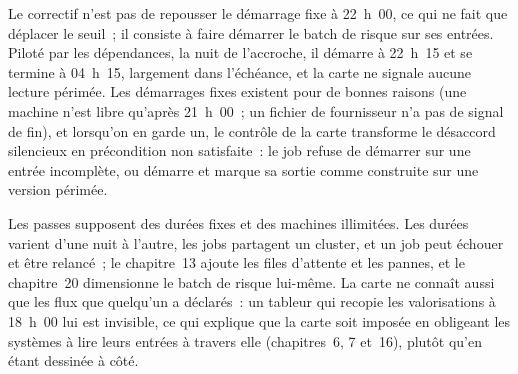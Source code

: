 \begin{omfigure}

\label{fig:pl:the-platform-map:hook}
\end{omfigure}

Le correctif n'est pas de repousser le démarrage fixe à 22~h~00, ce qui ne fait que déplacer le seuil~; il consiste à faire démarrer le batch de risque
sur ses entrées. Piloté par les dépendances, la nuit de l'accroche, il démarre à 22~h~15 et se termine à 04~h~15, largement dans l'échéance, et la carte
ne signale aucune lecture périmée. Les démarrages fixes existent pour de bonnes raisons (une machine n'est libre qu'après 21~h~00~;
un fichier de fournisseur n'a pas de signal de fin), et lorsqu'on en garde un, le contrôle de la carte transforme le désaccord silencieux en
précondition non satisfaite~: le job refuse de démarrer sur une entrée incomplète, ou démarre et marque sa sortie comme construite sur une version périmée.

\begin{remark}\label{rem:pl:the-platform-map:limits}
Les passes supposent des durées fixes et des machines illimitées. Les durées varient d'une nuit à l'autre, les jobs partagent un cluster, et un job
peut échouer et être relancé~; le chapitre~13 ajoute les files d'attente et les pannes, et le chapitre~20 dimensionne le batch de risque lui-même. La carte ne connaît
aussi que les flux que quelqu'un a déclarés~: un tableur qui recopie les valorisations à 18~h~00 lui est invisible, ce qui explique que la carte soit imposée
en obligeant les systèmes à lire leurs entrées à travers elle (chapitres~6, 7 et~16), plutôt qu'en étant dessinée à côté.
\end{remark}

